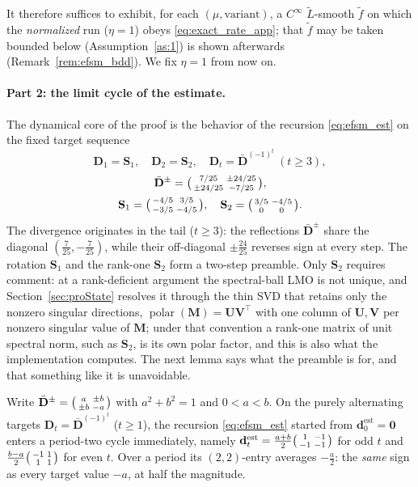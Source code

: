 \medskip\noindent
It therefore suffices to exhibit, for each $(\mu,\text{variant})$, a $C^\infty$
$\tilde L$-smooth $\tilde f$ on which the \emph{normalized} run ($\eta=1$) obeys
\eqref{eq:exact_rate_app}; that $\tilde f$ may be taken bounded below
(Assumption~\ref{as:1}) is shown afterwards (Remark~\ref{rem:efsm_bdd}). We fix
$\eta=1$ from now on.

\paragraph{Part 2: the limit cycle of the estimate.}
The dynamical core of the proof is the behavior of the recursion
\eqref{eq:efsm_est} on the fixed target sequence
\begin{equation}\label{eq:target_seq}
\mathbf D_1=\mathbf S_1,\quad \mathbf D_2=\mathbf S_2,\quad
\mathbf D_t=\bar{\mathbf D}^{(-1)^t}\ (t\ge3),
\end{equation}
\begin{equation}\label{eq:targets}
\begin{gathered}
\bar{\mathbf D}^{\pm}=\bigl(\begin{smallmatrix}7/25&\pm24/25\\\pm24/25&-7/25\end{smallmatrix}\bigr),\\
\mathbf S_1=\bigl(\begin{smallmatrix}-4/5&3/5\\-3/5&-4/5\end{smallmatrix}\bigr),\quad
\mathbf S_2=\bigl(\begin{smallmatrix}3/5&-4/5\\0&0\end{smallmatrix}\bigr).
\end{gathered}
\end{equation}
The divergence originates in the tail ($t\ge3$): the reflections
$\bar{\mathbf D}^{\pm}$ share the diagonal $(\tfrac7{25},-\tfrac7{25})$, while
their off-diagonal $\pm\tfrac{24}{25}$ reverses sign at every step. The rotation
$\mathbf S_1$ and the rank-one $\mathbf S_2$ form a two-step preamble. Only
$\mathbf S_2$ requires comment: at a rank-deficient argument the spectral-ball
LMO is not unique, and Section~\ref{sec:proState} resolves it through the thin
SVD that retains only the nonzero singular directions,
$\operatorname{polar}(\mathbf M)=\mathbf U\mathbf V^\top$ with one column of
$\mathbf U,\mathbf V$ per nonzero singular value of $\mathbf M$; under that
convention a rank-one matrix of unit spectral norm, such as $\mathbf S_2$, is
its own polar factor, and this is also what the implementation computes. The next lemma says
what the preamble is for, and that something like it is unavoidable.

\begin{lemma}\label{lem:efsm_twocycles}
Write $\bar{\mathbf D}^{\pm}=\bigl(\begin{smallmatrix}a&\pm b\\\pm b&-a\end{smallmatrix}\bigr)$ with $a^2+b^2=1$ and
$0<a<b$. On the purely alternating targets
$\mathbf D_t=\bar{\mathbf D}^{(-1)^t}$ ($t\ge1$), the recursion
\eqref{eq:efsm_est} started from $\mathbf d_0^{\mathrm{est}}=\mathbf 0$ enters a
period-two cycle immediately, namely
$\mathbf d_t^{\mathrm{est}}=\tfrac{a+b}{2}\bigl(\begin{smallmatrix}1&-1\\-1&-1\end{smallmatrix}\bigr)$ for odd $t$ and
$\tfrac{b-a}{2}\bigl(\begin{smallmatrix}-1&1\\1&1\end{smallmatrix}\bigr)$ for even $t$. Over a period its
$(2,2)$-entry averages $-\tfrac a2$: the \emph{same} sign as every target
value $-a$, at half the magnitude.
\end{lemma}
